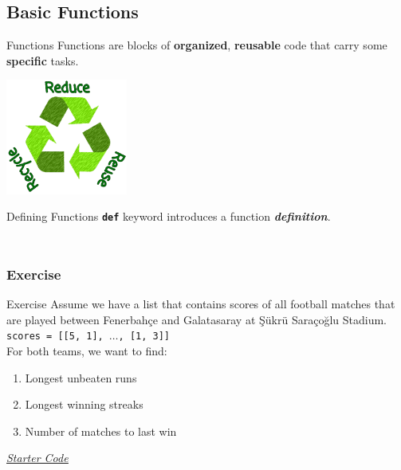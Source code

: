     \subsection{Basic Functions}

    \begin{frame}[c]{Functions}
        \LARGE
        Functions are blocks of
        \pause
        \textbf{organized},
        \pause
        \textbf{reusable} code
        \pause that carry some \textbf{specific} tasks.\\
        \pause
        \begin{center}
            \includegraphics[width=0.3\textwidth]{../Lecture2/images/reduce_reuse_recycle.png}
        \end{center}
    \end{frame}

    \begin{frame}{Defining Functions}
        \LARGE
        \textbf{\texttt{def}} keyword introduces a function \textbf{\textit{definition}}.
        \\
        \large
        \inputminted[firstline=14, lastline=16, frame=single,framesep=2pt]{python3}{../Lecture2/code-examples/menemen.py}
        \inputminted[firstline=18, lastline=20, frame=single,framesep=2pt]{python3}{../Lecture2/code-examples/menemen.py}
    \end{frame}

    \subsubsection{Exercise}

    \begin{frame}{Exercise}
        \Large
        Assume we have a list that contains scores of all football matches that are played between Fenerbahçe and Galatasaray at Şükrü Saraçoğlu Stadium.\\
        \pause
        \texttt{scores = [[5, 1], $\dots$, [1, 3]]}\\\pause
        For both teams, we want to find:\\\pause
        \begin{enumerate}
            \item Longest unbeaten runs \pause
            \item Longest winning streaks \pause
            \item Number of matches to last win \pause
        \end{enumerate}

        \href{https://github.com/koltpython/python-slides/raw/master/Lecture5/code-examples/rivalry.py}{\underline{\textit{Starter Code}}}
        
    \end{frame}

